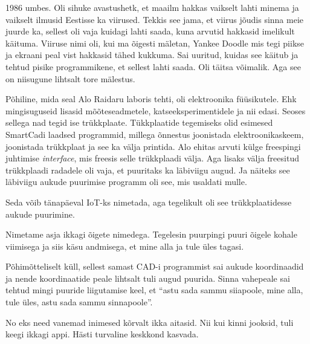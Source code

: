 1986 umbes. Oli sihuke avastushetk, et maailm hakkas vaikselt lahti minema ja 
vaikselt ilmusid Eestisse ka viirused. Tekkis see jama, et viirus jõudis sinna 
meie juurde ka, sellest oli vaja kuidagi lahti saada, kuna arvutid hakkasid 
imelikult käituma. Viiruse nimi oli, kui ma õigesti mäletan, Yankee 
Doodle mis tegi  piikse ja ekraani peal 
vist hakkasid tähed kukkuma. Sai uuritud, kuidas see käitub ja tehtud pisike 
programmikene, et sellest lahti saada. Oli täitsa võimalik. Aga see on 
niisugune lihtsalt tore mälestus. 

Põhiline, mida seal Alo Raidaru laboris tehti, oli 
elektroonika füüsikutele. Ehk mingisuguseid lisasid  mõõteseadmetele, 
katseeksperimentidele ja nii edasi. Seoses sellega nad tegid ise trükkplaate. 
Tükkplaatide tegemiseks olid esimesed SmartCadi laadsed programmid, millega 
õnnestus joonistada elektroonikaskeem, joonistada trükkplaat ja see ka välja 
printida. Alo ehitas arvuti külge freespingi juhtimise \emph{interface}, mis 
freesis selle trükkplaadi välja. Aga lisaks välja freesitud trükkplaadi 
radadele oli vaja, et puuritaks ka läbiviigu augud. Ja näiteks see läbiviigu 
aukude puurimise programm oli see, mis usaldati mulle.


Seda võib tänapäeval IoT-ks nimetada, aga tegelikult oli see trükkplaatidesse 
aukude puurimine. 


Nimetame asja ikkagi õigete nimedega. Tegelesin puurpingi puuri õigele kohale 
viimisega ja siis käsu andmisega, et mine alla ja tule üles tagasi.


Põhimõtteliselt küll, sellest samast CAD-i programmist sai aukude koordinaadid 
ja nende koordinaatide peale lihtsalt tuli augud puurida. Sinna  vahepeale sai 
tehtud mingi puuride liigutamise keel, et \enquote{astu sada sammu siiapoole, 
mine alla, tule üles, astu sada sammu sinnapoole}.


No eks need vanemad inimesed kõrvalt ikka aitasid. Nii kui kinni jooksid, tuli 
keegi ikkagi appi. Hästi turvaline keskkond kasvada.


